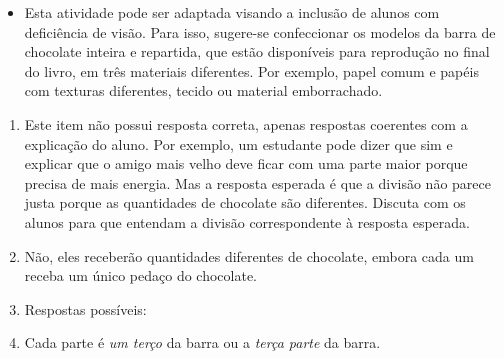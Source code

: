\begin{atividade}
\begin{itemize} %
    \item Esta atividade pode ser adaptada visando a inclusão de alunos com deficiência de visão. Para isso, sugere-se confeccionar os modelos da barra de chocolate  inteira e repartida, que estão disponíveis para reprodução no final do livro, em três materiais diferentes. Por exemplo, papel comum e papéis com texturas diferentes, tecido ou material emborrachado.
\end{itemize} %

\solucao
\begin{enumerate} %
    \item       Este item não possui resposta correta, apenas respostas coerentes com a explicação do aluno. Por exemplo, um estudante pode dizer que sim e explicar que o amigo mais velho deve ficar com uma parte maior porque precisa de mais energia. Mas a resposta esperada é que a divisão não parece justa porque as quantidades de chocolate são diferentes. Discuta com os alunos para que entendam a divisão correspondente à resposta esperada.
    \item Não, eles receberão quantidades diferentes de chocolate, embora cada um receba um único pedaço do chocolate.
    \item Respostas possíveis:

\begin{center}
\end{center}
    \item       Cada parte é {\itshape um terço} da barra ou a {\itshape terça parte} da barra.
\end{enumerate} %

\end{atividade}

